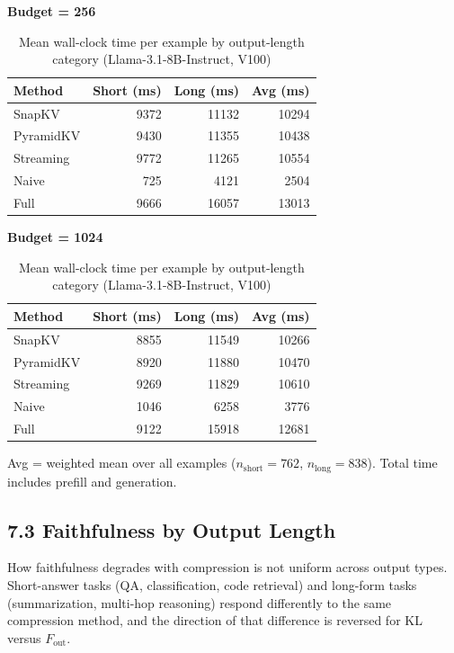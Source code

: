 \documentclass[10pt,letterpaper]{article}
\begin{document}
\begin{table}[H]
\centering
\small
\caption{Mean wall-clock time per example by output-length category (Llama-3.1-8B-Instruct, V100)}
\label{tab:instruct-timing}
\begin{minipage}[t]{0.47\textwidth}
\centering
\textbf{Budget = 256}\\[4pt]
\begin{tabular}{@{}lrrr@{}}
\toprule
Method & Short (ms) & Long (ms) & Avg (ms)\\
\midrule
SnapKV    &  9372 & 11132 & 10294\\
PyramidKV &  9430 & 11355 & 10438\\
Streaming &  9772 & 11265 & 10554\\
Naive     &   725 &  4121 &  2504\\
Full      &  9666 & 16057 & 13013\\
\bottomrule
\end{tabular}
\end{minipage}
\hfill
\begin{minipage}[t]{0.47\textwidth}
\centering
\textbf{Budget = 1024}\\[4pt]
\begin{tabular}{@{}lrrr@{}}
\toprule
Method & Short (ms) & Long (ms) & Avg (ms)\\
\midrule
SnapKV    &  8855 & 11549 & 10266\\
PyramidKV &  8920 & 11880 & 10470\\
Streaming &  9269 & 11829 & 10610\\
Naive     &  1046 &  6258 &  3776\\
Full      &  9122 & 15918 & 12681\\
\bottomrule
\end{tabular}
\end{minipage}

\medskip
Avg = weighted mean over all examples ($n_{\text{short}}=762$, $n_{\text{long}}=838$).
Total time includes prefill and generation.
\end{table}

\subsection{7.3 Faithfulness by Output Length}\label{faithfulness-by-output-length}

How faithfulness degrades with compression is not uniform across output types.
Short-answer tasks (QA, classification, code retrieval) and long-form tasks
(summarization, multi-hop reasoning) respond differently to the same compression method,
and the direction of that difference is reversed for KL versus \(F_{\text{out}}\).
\end{document}
